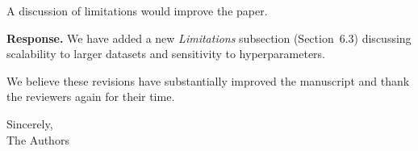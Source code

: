 \documentclass[11pt,a4paper]{article}
\newenvironment{response}%
  {\par\vspace{3pt}\begin{tcolorbox}[breakable,enhanced,boxrule=0pt,
     colback=white,left=12pt,right=6pt,top=4pt,bottom=4pt,
     borderline west={2.4pt}{0pt}{response}]%
   \textbf{\color{response}Response.}\enspace}%
  {\end{tcolorbox}}
\begin{document}
\begin{rvcomment}[2.2]
A discussion of limitations would improve the paper.
\end{rvcomment}
\begin{response}
We have added a new \textit{Limitations} subsection (Section~6.3) discussing scalability
to larger datasets and sensitivity to hyperparameters.
\end{response}

\bigskip
\noindent We believe these revisions have substantially improved the manuscript and thank
the reviewers again for their time.
\medskip

\noindent Sincerely,\\
The Authors
\end{document}
